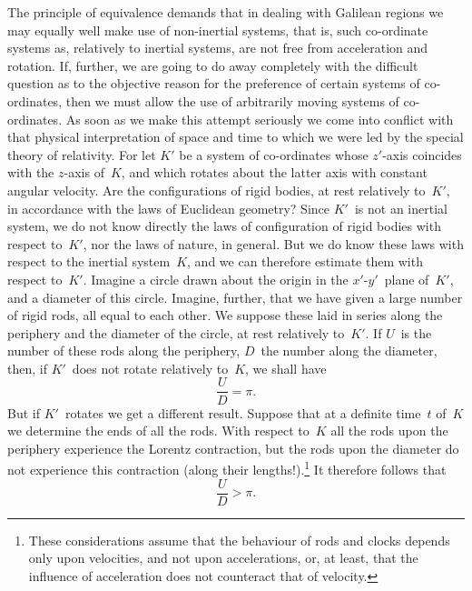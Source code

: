 \documentclass[12pt]{book}[2005/09/16]
\newcommand{\Change}[2]{#2}
\newcommand{\PageSep}[1]{\ignorespaces}
\begin{document}
The principle of equivalence demands that in dealing
with Galilean regions we may equally well make use of
non-inertial systems, that is, such co-ordinate systems as,
relatively to inertial systems, are not free from acceleration
and rotation. If, further, we are going to do away
completely with the difficult question as to the objective
reason for the preference of certain systems of co-ordinates,
then we must allow the use of arbitrarily moving systems
of co-ordinates. As soon as we make this attempt seriously
\PageSep{66}
%
we come into conflict with that physical interpretation of
space and time to which we were led by the special theory
of relativity. For let $K'$ be a system of co-ordinates whose
$z'$-axis coincides with the $z$-axis of~$K$, and which rotates
about the latter axis with constant angular velocity. Are
the configurations of rigid bodies, at rest relatively to~$K'$,
in accordance with the laws of Euclidean geometry?
Since $K'$~is not an inertial system, we do not know
directly the laws of configuration of rigid bodies with
respect to~$K'$, nor the laws of nature, in general. But
we do know these laws with respect to the inertial system~$K$,
and we can therefore estimate them with respect to~$K'$.
Imagine a circle drawn about the origin in the \Change{$x'y'$}{$x'$-$y'$}~plane
of~$K'$, and a diameter of this circle. Imagine, further, that
we have given a large number of rigid rods, all equal to
each other. We suppose these laid in series along the
periphery and the diameter of the circle, at rest relatively
to~$K'$. If $U$~is the number of these rods along the periphery,
$D$~the number along the diameter, then, if $K'$~does
not rotate relatively to~$K$, we shall have
\[
\frac{U}{D} = \pi.
\]
But if $K'$~rotates we get a different result. Suppose
that at a definite time~$t$\Change{,}{} of~$K$ we determine the ends of
all the rods. With respect to~$K$ all the rods upon the
periphery experience the Lorentz contraction, but the
rods upon the diameter do not experience this contraction
\PageSep{67}
(along their lengths!).\footnote
  {These considerations assume that the behaviour of rods and clocks
  depends only upon velocities, and not upon accelerations, or, at least, that
  the influence of acceleration does not counteract that of velocity.}
It therefore follows that
\[
\frac{U}{D} > \pi.
\]
\end{document}
